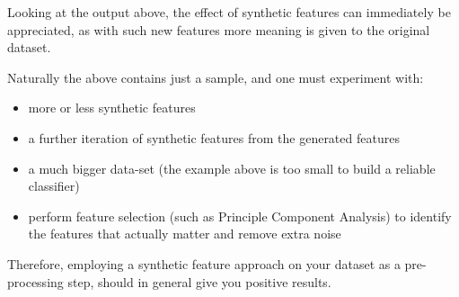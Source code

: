 \begin{table}[ht]
    \centering
    \selectfont
    \caption{Updated sample of the four rows from the Psy dataset from the YouTube comment training dataset now containg the synthetic features.}
    \label{tab:sf_updatedds}
\end{table}
\vspace{2mm}

Looking at the output above, the effect of synthetic features can immediately be appreciated, as with such new features more meaning is given to the original dataset.

Naturally the above contains just a sample, and one must experiment with:

\begin{itemize}
    \item more or less synthetic features
    \item a further iteration of synthetic features from the generated features
    \item a much bigger data-set (the example above is too small to build a reliable classifier)
    \item perform feature selection (such as Principle Component Analysis) to identify the features that actually matter and remove extra noise
\end{itemize}

Therefore, employing a synthetic feature approach on your dataset as a pre-processing step, should in general give you positive results.